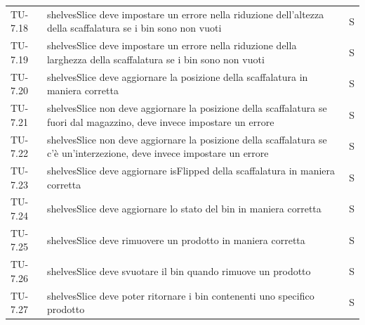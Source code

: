 \begin{xltabular}{0.9\textwidth}{X | p{0.6\textwidth} | p{0.1\textwidth} }
    TU-7.18 & shelvesSlice deve impostare un errore nella riduzione dell'altezza della scaffalatura se i bin sono non vuoti & S\\
    TU-7.19 & shelvesSlice deve impostare un errore nella riduzione della larghezza della scaffalatura se i bin sono non vuoti & S\\
    TU-7.20 & shelvesSlice deve aggiornare la posizione della scaffalatura in maniera corretta & S\\
    TU-7.21 & shelvesSlice non deve aggiornare la posizione della scaffalatura se fuori dal magazzino, deve invece impostare un errore & S\\
    TU-7.22 & shelvesSlice non deve aggiornare la posizione della scaffalatura se c'è un'interzezione, deve invece impostare un errore & S\\
    TU-7.23 & shelvesSlice deve aggiornare isFlipped della scaffalatura in maniera corretta & S\\
    TU-7.24 & shelvesSlice deve aggiornare lo stato del bin in maniera corretta & S\\
    TU-7.25 & shelvesSlice deve rimuovere un prodotto in maniera corretta & S\\
    TU-7.26 & shelvesSlice deve svuotare il bin quando rimuove un prodotto & S\\
    TU-7.27 & shelvesSlice deve poter ritornare i bin contenenti uno specifico prodotto & S\\  
    

\end{xltabular}
